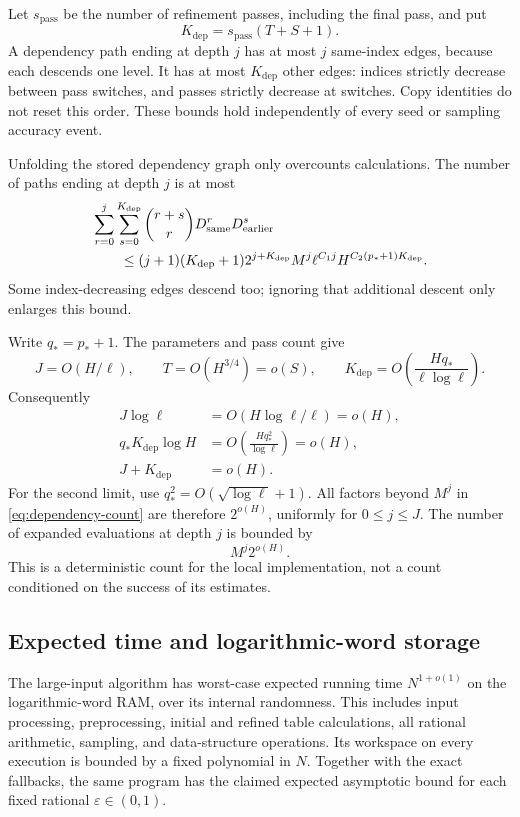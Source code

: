Let $s_{\mathrm{pass}}$ be the number of refinement passes, including
the final pass, and put
\[
 K_{\mathrm{dep}}=s_{\mathrm{pass}}(T+S+1).
\]
A dependency path ending at depth $j$ has at most $j$ same-index
edges, because each descends one level.  It has at most
$K_{\mathrm{dep}}$ other edges: indices strictly decrease between
pass switches, and passes strictly decrease at switches.  Copy
identities do not reset this order.  These bounds hold independently
of every seed or sampling accuracy event.

Unfolding the stored dependency graph only overcounts calculations.
The number of paths ending at depth $j$ is at most
\begin{align}
 &\sum_{r=0}^j\sum_{s=0}^{K_{\mathrm{dep}}}
   \binom{r+s}{r}D_{\mathrm{same}}^r
                       D_{\mathrm{earlier}}^s \notag\\
 &\qquad\le (j+1)(K_{\mathrm{dep}}+1)2^{j+K_{\mathrm{dep}}}
 M^j\ell^{C_1j}H^{C_2(p_*+1)K_{\mathrm{dep}}}.
 \label{eq:dependency-count}
\end{align}
Some index-decreasing edges descend too; ignoring that additional
descent only enlarges this bound.

Write $q_*=p_*+1$.  The parameters and pass count give
\[
 J=O(H/\ell),\qquad
 T=O(H^{3/4})=o(S),\qquad
 K_{\mathrm{dep}}=O\left(\frac{Hq_*}{\ell\log\ell}\right).
\]
Consequently
\begin{align*}
 J\log\ell&=O(H\log\ell/\ell)=o(H),\\
 q_*K_{\mathrm{dep}}\log H
   &=O\left(\frac{Hq_*^2}{\log\ell}\right)=o(H),\\
 J+K_{\mathrm{dep}}&=o(H).
\end{align*}
For the second limit, use
$q_*^2=O(\sqrt{\log\ell}+1)$.  All factors beyond $M^j$ in
\eqref{eq:dependency-count} are therefore $2^{o(H)}$, uniformly for
$0\le j\le J$.  The number of expanded evaluations at depth $j$
is bounded by
\begin{equation}
 M^j2^{o(H)}.
 \label{eq:depth-evaluations}
\end{equation}
This is a deterministic count for the local implementation, not a
count conditioned on the success of its estimates.

\subsection{Expected time and logarithmic-word storage}

\begin{theorem}
\label{thm:work}
The large-input algorithm has worst-case expected running time
$N^{1+o(1)}$ on the logarithmic-word RAM, over its internal
randomness.  This includes input processing, preprocessing, initial
and refined table calculations, all rational arithmetic, sampling,
and data-structure operations.  Its workspace on every execution
is bounded by a fixed polynomial in $N$.  Together with the exact
fallbacks, the same program has the claimed expected asymptotic
bound for each fixed rational $\varepsilon\in(0,1)$.
\end{theorem}

